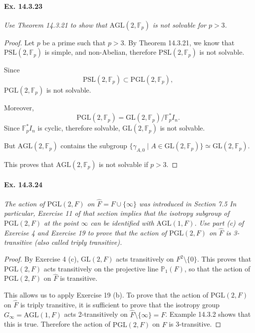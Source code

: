 \documentclass[11pt,a4paper]{article}
\newcommand{\F}{\mathbb{F}}
\begin{document}
{\paragraph{Ex. 14.3.23}{\it Use Theorem 14.3.21 to show that $\mathrm{AGL}(2,\F_p)$ is not solvable for $p>3$.
 }
    
\begin{proof}
Let $p$ be a prime such that $p>3$. By Theorem 14.3.21, we know that $\mathrm{PSL}(2,\F_p)$ is simple, and non-Abelian, therefore $\mathrm{PSL}(2,\F_p)$ is not solvable.

Since  $$\mathrm{PSL}(2,\F_p) \subset \mathrm{PGL}(2,\F_p), $$
$\mathrm{PGL}(2,\F_p)$ is not solvable.

Moreover, $$\mathrm{PGL}(2,\F_p) = \mathrm{GL}(2,\F_p)/\F_p^* I_n.$$
Since $\F_p^* I_n$ is cyclic, therefore solvable, $\mathrm{GL}(2,\F_p)$ is not solvable.

But $\mathrm{AGL}(2,\F_p)$ contains the subgroup $\{\gamma_{A,0} \mid A \in \mathrm{GL}(2,\F_p)\} \simeq \mathrm{GL}(2,\F_p)$.

This proves that $\mathrm{AGL}(2,\F_p)$ is not solvable if $p>3$.
\end{proof}

\paragraph{Ex. 14.3.24}{\it
The action of $\mathrm{PGL}(2,F)$ on $\hat F = F \cup \{\infty\}$ was introduced in Section 7.5 In particular, Exercise 11 of that section implies that the isotropy subgroup of $\mathrm{PGL}(2,F)$ at the point $\infty$ can be identified with $\mathrm{AGL}(1,F)$. Use part (c) of Exercise 4 and Exercise 19 to prove that the action of $\mathrm{PGL}(2,F)$ on $\hat F$ is 3-transitive (also called triply transitive).
}
\begin{proof}
By Exercise 4 (c), $\mathrm{GL}(2,F)$ acts transitively on $F^2 \setminus \{0\}$. This proves that $\mathrm{PGL}(2,F)$ acts transitively on the projective line $\mathbb{P}_1(F)$, so that the action of $\mathrm{PGL}(2,F)$ on $\hat F$ is transitive.

This allows us to apply Exercise 19 (b). To prove that the action of $\mathrm{PGL}(2,F)$ on $\hat F$ is triply transitive, it is sufficient to prove that the isotropy group $G_{\infty} = \mathrm{AGL}(1,F)$ acts 2-transitively on $ \hat F \setminus \{\infty\} = F$. Example 14.3.2 shows that this is true. Therefore the action of $\mathrm{PGL}(2,F)$ on $\hat F$ is 3-transitive.
\end{proof}

}
\end{document}
